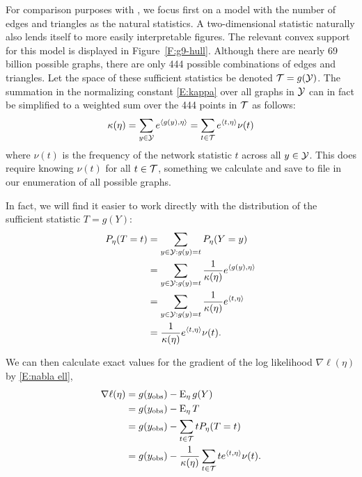 
For comparison purposes with \citet{Rinaldo:2009}, we focus first on a model with the number 
of edges and triangles as the natural statistics.  A two-dimensional statistic 
naturally also lends itself to more easily interpretable figures.  The relevant convex support for this model is displayed in Figure~\ref{F:g9-hull}.  Although there are nearly 69 billion
possible graphs, there are only 444 possible combinations of edges and triangles.
Let the space of these sufficient statistics be denoted ${\mathcal T} = g({\mathcal Y})$.
The summation in the normalizing constant \eqref{E:kappa} over all graphs in ${\mathcal Y}$ can in fact be simplified
 to a weighted sum over the 444 points in ${\mathcal T}$ as follows:
\begin{align*}
	\kappa(\eta) = \sum_{y \in {\mathcal Y}} e^{\langle g(y),\eta \rangle } = 	\sum_{t \in {\mathcal T}} e^{\langle t,\eta \rangle } \nu(t)
\end{align*}
where $\nu(t)$ is the frequency of the network statistic $t$ across all $y \in {\mathcal Y}$.  
This does require knowing $\nu(t)$ for all $t \in {\mathcal T}$, something we calculate
and save to file in our enumeration of all possible graphs.

In fact, we will find it easier to work directly with the distribution of the sufficient
statistic $T=g(Y)$:
\begin{align*}
	P_\eta(T=t) 	&= \sum_{y \in {\mathcal Y}: g(y) = t} P_\eta(Y= y ) \\
		 		&= \sum_{y \in {\mathcal Y}: g(y) = t} \frac{1}{\kappa(\eta)} e^{\langle g(y),\eta \rangle } \\
				&= \sum_{y \in {\mathcal Y}: g(y) = t} \frac{1}{\kappa(\eta)} e^{\langle t,\eta \rangle } \\
				&= \frac{1}{\kappa(\eta)} e^{\langle t,\eta \rangle } \nu(t).
\end{align*}

We can then calculate exact values for the gradient of the log likelihood $\nabla \ell(\eta)$ by \eqref{E:nabla ell},
\begin{align*}
	\nabla \ell (\eta) &= g(y_{\textrm{obs}}) - \operatorname{E}_\eta g(Y)\\ 
					  &= g(y_{\textrm{obs}}) - \operatorname{E}_\eta T \\
					  &= g(y_{\textrm{obs}}) - \sum_{t \in {\mathcal T}} t P_\eta(T = t) \\
					  &= g(y_{\textrm{obs}}) - \frac{1}{\kappa(\eta)}  \sum_{t \in {\mathcal T}} t e^{\langle t,\eta \rangle } \nu(t).
\end{align*}

